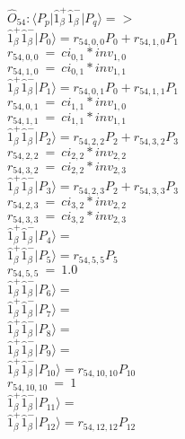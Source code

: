 \documentclass[14pt]{article}
\begin{document}
    $\hat{O}_{54}:  \langle{P_p}\vert \hat{1}_{\beta}^{+}\hat{1}_{\beta}^{-} \vert{P_q}\rangle => $ \\ 
    $ \hat{1}_{\beta}^{+}\hat{1}_{\beta}^{-} \vert{P_{0}}\rangle = {r}_{54,0,0}P_{0}+{r}_{54,1,0}P_{1} $ \\ 
    ${r}_{54,0,0}\ =\ {ci}_{0,1}*{inv}_{1,0} $ \\ 
    ${r}_{54,1,0}\ =\ {ci}_{0,1}*{inv}_{1,1} $ \\ 
    $ \hat{1}_{\beta}^{+}\hat{1}_{\beta}^{-} \vert{P_{1}}\rangle = {r}_{54,0,1}P_{0}+{r}_{54,1,1}P_{1} $ \\ 
    ${r}_{54,0,1}\ =\ {ci}_{1,1}*{inv}_{1,0} $ \\ 
    ${r}_{54,1,1}\ =\ {ci}_{1,1}*{inv}_{1,1} $ \\ 
    $ \hat{1}_{\beta}^{+}\hat{1}_{\beta}^{-} \vert{P_{2}}\rangle = {r}_{54,2,2}P_{2}+{r}_{54,3,2}P_{3} $ \\ 
    ${r}_{54,2,2}\ =\ {ci}_{2,2}*{inv}_{2,2} $ \\ 
    ${r}_{54,3,2}\ =\ {ci}_{2,2}*{inv}_{2,3} $ \\ 
    $ \hat{1}_{\beta}^{+}\hat{1}_{\beta}^{-} \vert{P_{3}}\rangle = {r}_{54,2,3}P_{2}+{r}_{54,3,3}P_{3} $ \\ 
    ${r}_{54,2,3}\ =\ {ci}_{3,2}*{inv}_{2,2} $ \\ 
    ${r}_{54,3,3}\ =\ {ci}_{3,2}*{inv}_{2,3} $ \\ 
    $ \hat{1}_{\beta}^{+}\hat{1}_{\beta}^{-} \vert{P_{4}}\rangle =  $ \\ 
    $ \hat{1}_{\beta}^{+}\hat{1}_{\beta}^{-} \vert{P_{5}}\rangle = {r}_{54,5,5}P_{5} $ \\ 
    ${r}_{54,5,5}\ =\ 1.0 $ \\ 
    $ \hat{1}_{\beta}^{+}\hat{1}_{\beta}^{-} \vert{P_{6}}\rangle =  $ \\ 
    $ \hat{1}_{\beta}^{+}\hat{1}_{\beta}^{-} \vert{P_{7}}\rangle =  $ \\ 
    $ \hat{1}_{\beta}^{+}\hat{1}_{\beta}^{-} \vert{P_{8}}\rangle =  $ \\ 
    $ \hat{1}_{\beta}^{+}\hat{1}_{\beta}^{-} \vert{P_{9}}\rangle =  $ \\ 
    $ \hat{1}_{\beta}^{+}\hat{1}_{\beta}^{-} \vert{P_{10}}\rangle = {r}_{54,10,10}P_{10} $ \\ 
    ${r}_{54,10,10}\ =\ 1 $ \\ 
    $ \hat{1}_{\beta}^{+}\hat{1}_{\beta}^{-} \vert{P_{11}}\rangle =  $ \\ 
    $ \hat{1}_{\beta}^{+}\hat{1}_{\beta}^{-} \vert{P_{12}}\rangle = {r}_{54,12,12}P_{12} $ \\ 
\end{document}
